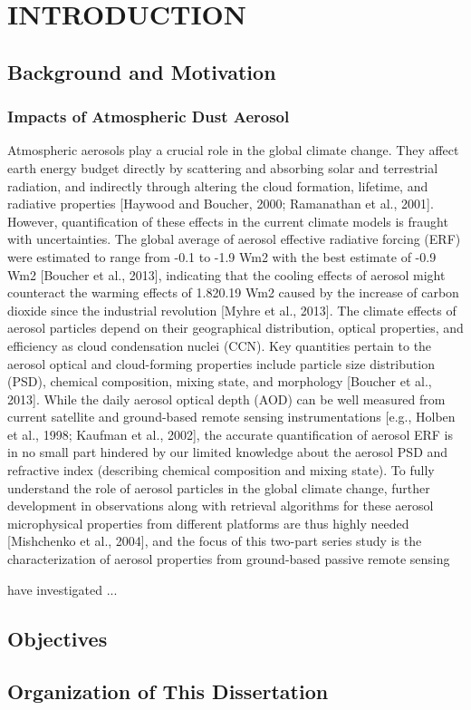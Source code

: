 
\chapter{INTRODUCTION}

\section{Background and Motivation}

\subsection{Impacts of Atmospheric Dust Aerosol}

Atmospheric aerosols play a crucial role in the global 
climate change. They affect earth energy budget directly 
by scattering and absorbing solar and terrestrial radiation, 
and indirectly through altering the cloud formation, 
lifetime, and radiative properties [Haywood and Boucher, 
2000; Ramanathan et al., 2001]. However, quantification of 
these effects in the current climate models is fraught with 
uncertainties. The global average of aerosol effective 
radiative forcing (ERF) were estimated to range from -0.1 
to -1.9 Wm2 with the best estimate of -0.9 Wm2 [Boucher et 
al., 2013], indicating that the cooling effects of aerosol 
might counteract the warming effects of 1.820.19 Wm2 caused
by the increase of carbon dioxide since the industrial 
revolution [Myhre et al., 2013]. The climate effects of 
aerosol particles depend on their geographical distribution, 
optical properties, and efficiency as cloud condensation 
nuclei (CCN). Key quantities pertain to the aerosol optical 
and cloud-forming properties include particle size 
distribution (PSD), chemical composition, mixing state, and 
morphology [Boucher et al., 2013]. While the daily aerosol 
optical depth (AOD) can be well measured from current 
satellite and ground-based remote sensing instrumentations 
[e.g., Holben et al., 1998; Kaufman et al., 2002], the 
accurate quantification of aerosol ERF is in no small part 
hindered by our limited knowledge about the aerosol PSD and 
refractive index (describing chemical composition and 
mixing state). To fully understand the role of aerosol 
particles in the global climate change, further development 
in observations along with retrieval algorithms for these 
aerosol microphysical properties from different platforms 
are thus highly needed [Mishchenko et al., 2004], and 
the focus of this two-part series study is the 
characterization of aerosol properties from ground-based 
passive remote sensing %

\cite{koven2008} have investigated ...

\section{Objectives}

\section{Organization of This Dissertation}

